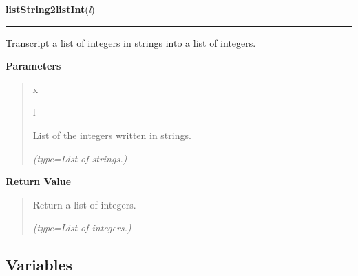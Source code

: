 \hspace{.8\funcindent}\begin{boxedminipage}{\funcwidth}

    \raggedright \textbf{listString2listInt}(\textit{l})

    \vspace{-1.5ex}

    \rule{\textwidth}{0.5\fboxrule}
\setlength{\parskip}{2ex}
    Transcript a list of integers in strings into a list of integers.

\setlength{\parskip}{1ex}
      \textbf{Parameters}
      \vspace{-1ex}

      \begin{quote}
        \begin{Ventry}{x}

          \item[l]

          List of the integers written in strings.

            {\it (type=List of strings.)}

        \end{Ventry}

      \end{quote}

      \textbf{Return Value}
    \vspace{-1ex}

      \begin{quote}
      Return a list of integers.

      {\it (type=List of integers.)}

      \end{quote}

    \end{boxedminipage}



  \subsection{Variables}

